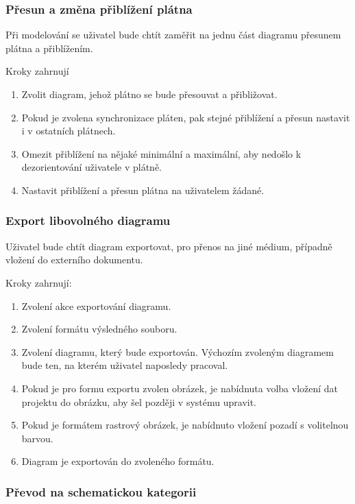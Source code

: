 \subsubsection*{Přesun a změna přiblížení plátna}

Při modelování se uživatel bude chtít zaměřit na jednu část diagramu přesunem plátna a přiblížením.

Kroky zahrnují
\begin{enumerate}
  \item Zvolit diagram, jehož plátno se bude přesouvat a přibližovat.
  \item Pokud je zvolena synchronizace pláten, pak stejné přiblížení a přesun nastavit i v ostatních plátnech.
  \item Omezit přiblížení na nějaké minimální a maximální, aby nedošlo k dezorientování uživatele v plátně.
  \item Nastavit přiblížení a přesun plátna na uživatelem žádané.
\end{enumerate}

\subsubsection*{Export libovolného diagramu}

Uživatel bude chtít diagram exportovat, pro přenos na jiné médium, případně vložení do externího dokumentu.

Kroky zahrnují:
\begin{enumerate}
  \item Zvolení akce exportování diagramu.
  \item Zvolení formátu výsledného souboru.
  \item Zvolení diagramu, který bude exportován.
        Výchozím zvoleným diagramem bude ten, na kterém uživatel naposledy pracoval.
  \item Pokud je pro formu exportu zvolen obrázek, je nabídnuta volba vložení dat projektu do obrázku, aby šel později v systému upravit.
  \item Pokud je formátem rastrový obrázek, je nabídnuto vložení pozadí s volitelnou barvou.
  \item Diagram je exportován do zvoleného formátu.
\end{enumerate}

\subsubsection*{Převod na schematickou kategorii}

